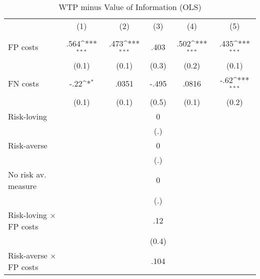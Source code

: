 \begin{table}[htbp]\centering
\def\sym#1{\ifmmode^{#1}\else\(^{#1}\)\fi}
\caption{WTP minus Value of Information (OLS)}
\begin{tabular}{l*{5}{c}}
\hline\hline
                &\multicolumn{1}{c}{(1)}&\multicolumn{1}{c}{(2)}&\multicolumn{1}{c}{(3)}&\multicolumn{1}{c}{(4)}&\multicolumn{1}{c}{(5)}\\
                &\multicolumn{1}{c}{}&\multicolumn{1}{c}{}&\multicolumn{1}{c}{}&\multicolumn{1}{c}{}&\multicolumn{1}{c}{}\\
\hline
FP costs        &     .564\sym{***}&     .473\sym{***}&     .403         &     .502\sym{***}&     .435\sym{***}\\
                &    (0.1)         &    (0.1)         &    (0.3)         &    (0.2)         &    (0.1)         \\
FN costs        &     -.22\sym{*}  &    .0351         &    -.495         &    .0816         &     -.62\sym{***}\\
                &    (0.1)         &    (0.1)         &    (0.5)         &    (0.1)         &    (0.2)         \\
Risk-loving     &                  &                  &        0         &                  &                  \\
                &                  &                  &      (.)         &                  &                  \\
Risk-averse     &                  &                  &        0         &                  &                  \\
                &                  &                  &      (.)         &                  &                  \\
No risk av. measure&                  &                  &        0         &                  &                  \\
                &                  &                  &      (.)         &                  &                  \\
Risk-loving $\times$ FP costs&                  &                  &      .12         &                  &                  \\
                &                  &                  &    (0.4)         &                  &                  \\
Risk-averse $\times$ FP costs&                  &                  &     .104         &                  &                  \\

\end{tabular}
\end{table}
